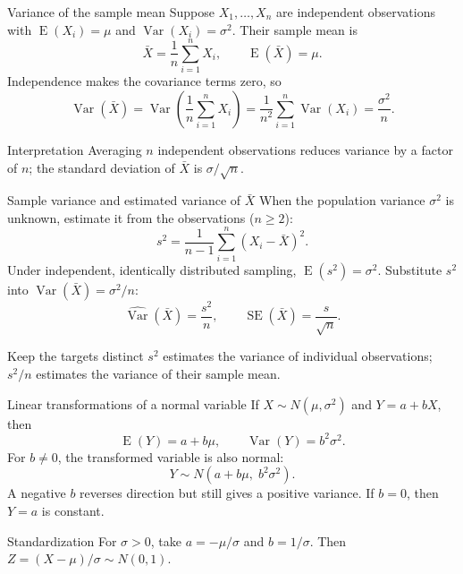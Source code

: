 \documentclass[aspectratio=169,11pt]{beamer}
\newcommand{\E}{\operatorname{E}}
\newcommand{\Var}{\operatorname{Var}}
\begin{document}
\begin{frame}{Variance of the sample mean}
  \small
  Suppose \(X_1,\ldots,X_n\) are independent observations with
  \(\E(X_i)=\mu\) and \(\Var(X_i)=\sigma^2\). Their sample mean is
  \[
    \bar X=\frac{1}{n}\sum_{i=1}^n X_i,\qquad \E(\bar X)=\mu.
  \]
  Independence makes the covariance terms zero, so
  \[
    \Var(\bar X)
      =\Var\left(\frac{1}{n}\sum_{i=1}^n X_i\right)
      =\frac{1}{n^2}\sum_{i=1}^n\Var(X_i)
      ={\frac{\sigma^2}{n}}.
  \]
  \begin{block}{Interpretation}
    Averaging \(n\) independent observations reduces variance by a factor
    of \(n\); the standard deviation of \(\bar X\) is \(\sigma/\sqrt n\).
  \end{block}
\end{frame}

\begin{frame}{Sample variance and estimated variance of \(\bar X\)}
  \small
  When the population variance \(\sigma^2\) is unknown, estimate it from
  the observations (\(n\geq2\)):
  \[
    s^2=\frac{1}{n-1}\sum_{i=1}^n(X_i-\bar X)^2.
  \]
  Under independent, identically distributed sampling,
  \(\E(s^2)=\sigma^2\). Substitute \(s^2\) into \(\Var(\bar X)=\sigma^2/n\):
  \[
    {\widehat{\Var}(\bar X)=\frac{s^2}{n}},
    \qquad
    {\operatorname{SE}(\bar X)
      =\frac{s}{\sqrt n}}.
  \]
  \begin{alertblock}{Keep the targets distinct}
    \(s^2\) estimates the variance of individual observations;
    \(s^2/n\) estimates the variance of their sample mean.
  \end{alertblock}
\end{frame}

\begin{frame}{Linear transformations of a normal variable}
  \small
  If \(X\sim N(\mu,\sigma^2)\) and \(Y=a+bX\), then
  \[
    \E(Y)=a+b\mu,\qquad \Var(Y)=b^2\sigma^2.
  \]
  For \(b\neq0\), the transformed variable is also normal:
  \[
    {Y\sim N(a+b\mu,\;b^2\sigma^2)}.
  \]
  A negative \(b\) reverses direction but still gives a positive variance.
  If \(b=0\), then \(Y=a\) is constant.
  \begin{block}{Standardization}
    For \(\sigma>0\), take \(a=-\mu/\sigma\) and \(b=1/\sigma\).
    Then \(Z=(X-\mu)/\sigma\sim N(0,1)\).
  \end{block}
\end{frame}
\end{document}
